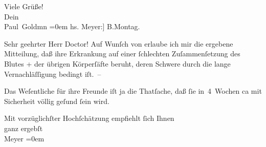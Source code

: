 \pstart
           Viele Grüße! {\\[\baselineskip]}Dein {\\[\baselineskip]}\spacefill\mbox{Paul Goldmn}\pend
           \leftskip=0em{}\vspace{1em}{\vspace{1\baselineskip}}
\pstart
           \raggedleft{}{\pb}{[}hs. Meyer:{]} B.Montag.\pend
           
\pstart\center{}Sehr geehrter Herr Doctor!\pend\vspace{0.5em}
\pstart
           Auf Wunſch von \label{K_L03058-2v}\label{K_L03058-2} erlaube ich mir die ergebene Mitteilung, daß ihre Erkrankung auf einer{ }ſchlechten Zuſammenſetzung des Blutes + der übrigen Körperſäfte beruht, deren Schwere
               durch die lange Vernachläſſigung bedingt iſt. –\pend
           
\pstart
           Das Weſentliche für {\pb}ihre Freunde iſt ja die
               Thatſache, daß{ }ſie in 4 Wochen ca mit Sicherheit völlig geſund{ }ſein wird.\pend
           
\pstart
           Mit vorzüglichſter Hochſchätzung empfiehlt{ }ſich Ihnen {\\[\baselineskip]}ganz ergebſt { }{\\[\baselineskip]}\spacefill\mbox{Meyer}\pend
           \leftskip=0em{}\endnumbering{}  \newcommand{\dateiname}{L03058}\newcommand{\titel}{Paul Goldmann an Arthur Schnitzler, 14. 2. [1901]}\newcommand{\editorInnen}{Martin Anton Müller und Laura Untner}
